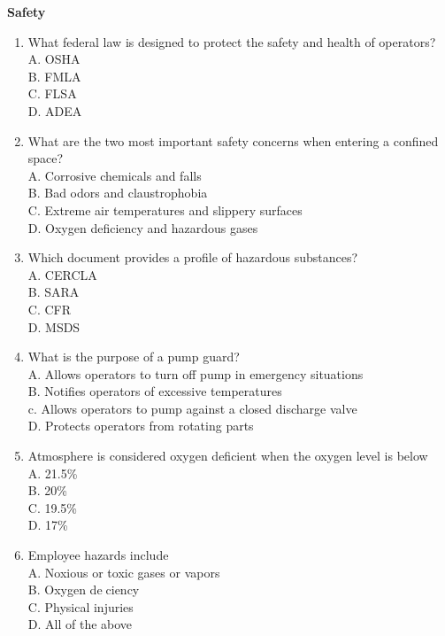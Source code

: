 \documentclass{article}
\begin{document}
\newpage
\textbf{Safety}
\begin{enumerate}

\item What federal law is designed to protect the safety and health of operators?\\
A.	OSHA\\
B.	FMLA\\
C.	FLSA\\
D.	ADEA

\item What are the two most important safety concerns when entering a confined space?\\
A.	Corrosive chemicals and falls\\
B.	Bad odors and claustrophobia\\
C.	Extreme air temperatures and slippery surfaces\\
D.	Oxygen deficiency and hazardous gases

\item Which document provides a profile of hazardous substances?\\
A.	CERCLA\\
B.	SARA\\
C.	CFR\\
D.	MSDS

\item What is the purpose of a pump guard?\\
A.	Allows operators to turn off pump in emergency situations\\
B.	Notifies operators of excessive temperatures\\
c.	Allows operators to pump against a closed discharge valve\\
D.	Protects operators from rotating parts

\item Atmosphere is considered oxygen deficient when the oxygen level is below\\
A.	21.5\%\\
B.	20\%\\
C.	19.5\%\\
D.  17\%


\item Employee hazards include\\
A. Noxious or toxic gases or vapors\\
B. Oxygen deciency\\
C. Physical injuries\\
D. All of the above\\


\end{enumerate}
\end{document}
